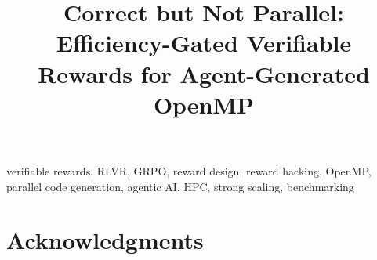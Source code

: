 \documentclass[conference]{IEEEtran}
\begin{document}
\title{Correct but Not Parallel: Efficiency-Gated Verifiable Rewards for Agent-Generated OpenMP}


\author{
}


\maketitle
 

 
\begin{IEEEkeywords}
verifiable rewards, RLVR, GRPO, reward design, reward hacking, OpenMP,
parallel code generation, agentic AI, HPC, strong scaling, benchmarking
\end{IEEEkeywords}
 








 
\section*{Acknowledgments}
 
\balance


 

\end{document}
